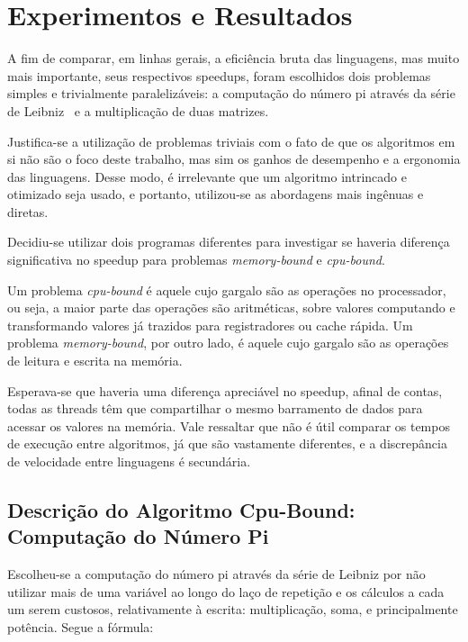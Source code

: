 \documentclass{article}
\begin{document}

\section{Experimentos e Resultados}
\label{sec:experimentos e resultados}

A fim de comparar, em linhas gerais, a eficiência bruta das linguagens, mas muito mais importante, seus respectivos speedups, foram escolhidos dois problemas simples e trivialmente paralelizáveis: a computação do número pi através da série de Leibniz~\cite{weisstein2002pi} e a multiplicação de duas matrizes.

Justifica-se a utilização de problemas triviais com o fato de que os algoritmos em si não são o foco deste trabalho, mas sim os ganhos de desempenho e a ergonomia das linguagens. Desse modo, é irrelevante que um algoritmo intrincado e otimizado seja usado, e portanto, utilizou-se as abordagens mais ingênuas e diretas.

Decidiu-se utilizar dois programas diferentes para investigar se haveria diferença significativa no speedup para problemas \emph{memory-bound} e \emph{cpu-bound}.

Um problema \emph{cpu-bound} é aquele cujo gargalo são as operações no processador, ou seja, a maior parte das operações são aritméticas, sobre valores computando e transformando valores já trazidos para registradores ou cache rápida. Um problema \emph{memory-bound}, por outro lado, é aquele cujo gargalo são as operações de leitura e escrita na memória.

Esperava-se que haveria uma diferença apreciável no speedup, afinal de contas, todas as threads têm que compartilhar o mesmo barramento de dados para acessar os valores na memória. Vale ressaltar que não é útil comparar os tempos de execução entre algoritmos, já que são vastamente diferentes, e a discrepância de velocidade entre linguagens é secundária.

\subsection{Descrição do Algoritmo Cpu-Bound: Computação do Número Pi}
\label{ssec:descricao algoritmo pi}

Escolheu-se a computação do número pi através da série de Leibniz por não utilizar mais de uma variável ao longo do laço de repetição e os cálculos a cada um serem custosos, relativamente à escrita: multiplicação, soma, e principalmente potência. Segue a fórmula:
\end{document}
